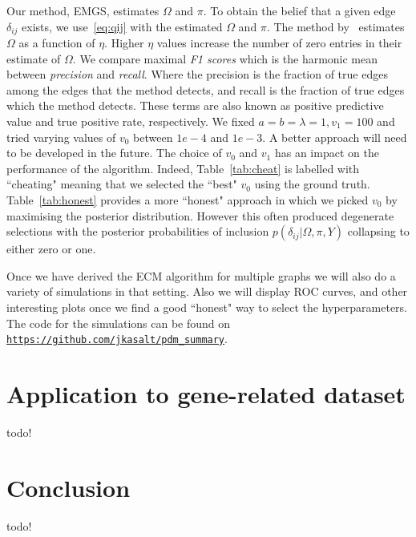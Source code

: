 \documentclass{scrartcl}
\newcommand{\1}{\mathds{1}}
\begin{document}
Our method, EMGS, estimates $\Omega$ and $\pi$. To obtain the belief that a given
edge $\delta_{ij}$ exists, we use~\eqref{eq:qij} with the estimated $\Omega$
and $\pi$.
The method by~\cite{mein2006} estimates $\Omega$ as a function of $\eta.$ Higher $\eta$ values increase the number of zero entries in their estimate of $\Omega.$
We compare maximal \emph{F1 scores} which is the harmonic mean between \emph{precision}
and \emph{recall}. Where the precision is the fraction of true edges
among the edges that the method detects, and recall is the fraction
of true edges which the method detects. These terms are also known as
positive predictive value and true positive rate, respectively.
We fixed $a = b = \lambda = 1, v_1 = 100$ and tried varying
values of $v_0$ between $1e-4$ and $1e-3$.
A better approach will need to be developed in the future.
The choice of $v_0$ and $v_1$ has an impact on the performance of the algorithm.
Indeed, Table~\ref{tab:cheat} is labelled with ``cheating" meaning that we selected the ``best" $v_0$ using the ground truth.
Table~\ref{tab:honest} provides a more ``honest" approach in which we picked $v_0$ by
maximising the posterior distribution.
However this often produced degenerate selections with the posterior probabilities of inclusion $p(\delta_{ij} | \Omega, \pi, Y)$ collapsing to either zero or one.

Once we have derived the ECM algorithm for multiple graphs we will also do a variety of simulations in that setting.
Also we will display ROC curves, and other interesting plots once we find a good ``honest" way to select the hyperparameters.
The code for the simulations can be found on \href{https://github.com/jkasalt/pdm_summary}{\texttt{https://github.com/jkasalt/pdm\_summary}}.

\section{Application to gene-related dataset}
todo!

\section{Conclusion}
todo!

\printbibliography
\end{document}
